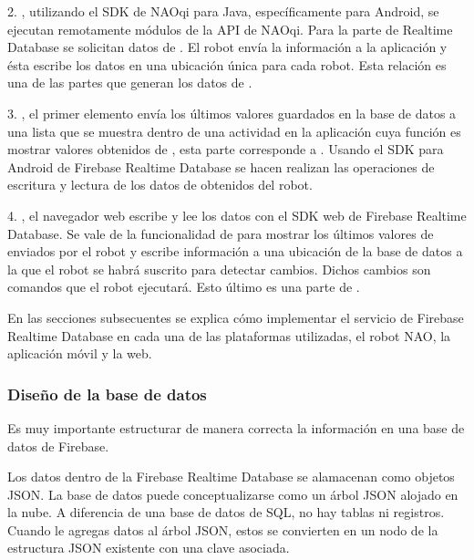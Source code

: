 2. , utilizando el SDK de NAOqi para Java,
específicamente para Android, se ejecutan remotamente módulos de la API de NAOqi.
Para la parte de Realtime Database se solicitan datos de . El robot
envía la información a la aplicación y ésta escribe los datos en una ubicación
única para cada robot. Esta relación es una de las partes que generan los datos
de .

3. , el primer elemento
envía los últimos valores guardados en la base de datos a una lista que se muestra
dentro de una actividad en la aplicación cuya función es mostrar valores
obtenidos de , esta parte corresponde a . Usando
el SDK para Android de Firebase Realtime Database se hacen realizan las
operaciones de escritura y lectura de los datos de 
obtenidos del robot.

4. , el navegador web escribe y
lee los datos con el SDK web de Firebase Realtime Database. Se vale de
la funcionalidad de  para mostrar los últimos valores de 
enviados por el robot y escribe información a una ubicación de la base de
datos a la que el robot se habrá suscrito para detectar cambios. Dichos cambios
son comandos que el robot ejecutará. Esto último es una parte de
.

En las secciones subsecuentes se explica cómo implementar el servicio de
Firebase Realtime Database en cada una de las plataformas utilizadas, el robot
NAO, la aplicación móvil y la web.


\subsubsection{Diseño de la base de datos}
\label{\detokenize{chapter_two/desc_cloudnao:diseno-de-la-base-de-datos}}
Es muy importante estructurar de manera correcta la información en una base
de datos de Firebase.

Los datos dentro de la Firebase Realtime Database se alamacenan como objetos
JSON. La base de datos puede conceptualizarse como un árbol JSON alojado en la
nube. A diferencia de una base de datos de SQL, no hay tablas ni registros.
Cuando le agregas datos al árbol JSON, estos se convierten en un nodo de la
estructura JSON existente con una clave asociada.

